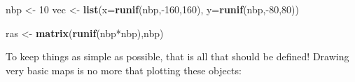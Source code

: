 \documentclass[]{report}
\newenvironment{Shaded}{\begin{snugshade}}{\end{snugshade}}
\newcommand{\KeywordTok}[1]{\textcolor[rgb]{0.13,0.29,0.53}{\textbf{{#1}}}}
\newcommand{\DataTypeTok}[1]{\textcolor[rgb]{0.13,0.29,0.53}{{#1}}}
\newcommand{\DecValTok}[1]{\textcolor[rgb]{0.00,0.00,0.81}{{#1}}}
\newcommand{\StringTok}[1]{\textcolor[rgb]{0.31,0.60,0.02}{{#1}}}
\newcommand{\NormalTok}[1]{{#1}}
\begin{document}
\begin{Shaded}
\begin{Highlighting}[]
\NormalTok{nbp <-}\StringTok{ }\DecValTok{10}
\NormalTok{vec <-}\StringTok{ }\KeywordTok{list}\NormalTok{(}\DataTypeTok{x=}\KeywordTok{runif}\NormalTok{(nbp,-}\DecValTok{160}\NormalTok{,}\DecValTok{160}\NormalTok{), }\DataTypeTok{y=}\KeywordTok{runif}\NormalTok{(nbp,-}\DecValTok{80}\NormalTok{,}\DecValTok{80}\NormalTok{))}
\end{Highlighting}
\end{Shaded}

\begin{Shaded}
\begin{Highlighting}[]
\NormalTok{ras <-}\StringTok{ }\KeywordTok{matrix}\NormalTok{(}\KeywordTok{runif}\NormalTok{(nbp*nbp),nbp)}
\end{Highlighting}
\end{Shaded}

To keep things as simple as possible, that is all that should be
defined! Drawing very basic maps is no more that plotting these objects:
\end{document}
